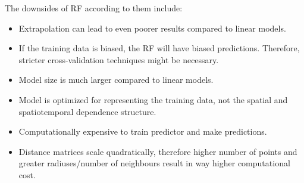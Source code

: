 The downsides of RF according to them include:

\begin{itemize}
    \item Extrapolation can lead to even poorer results compared to linear models.
    \item If the training data is biased, the RF will have biased predictions. Therefore, stricter cross-validation techniques might be necessary.
    \item Model size is much larger compared to linear models.
    \item Model is optimized for representing the training data, not the spatial and spatiotemporal dependence structure.
    \item Computationally expensive to train predictor and make predictions.
    \item Distance matrices scale quadratically, therefore higher number of points and greater radiuses/number of neighbours result in way higher computational cost. 
\end{itemize}

